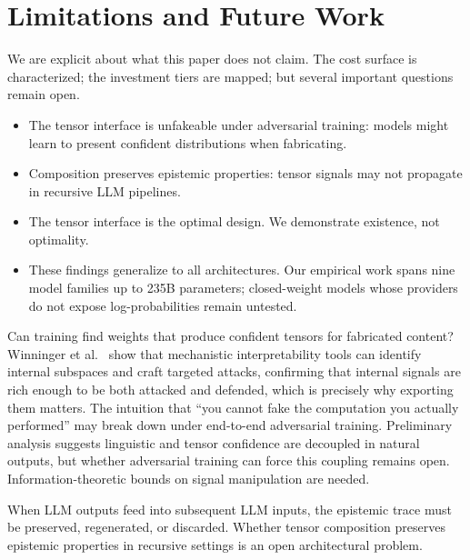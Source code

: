 \section{Limitations and Future Work}\label{sec:discussion}

We are explicit about what this paper does not claim. The cost surface
is characterized; the investment tiers are mapped; but several important
questions remain open.

\begin{itemize}
\item The tensor interface is unfakeable under adversarial training: models
  might learn to present confident distributions when fabricating.
\item Composition preserves epistemic properties: tensor signals may not
  propagate in recursive LLM pipelines.
\item The tensor interface is the optimal design. We demonstrate existence, not
  optimality.
\item These findings generalize to all architectures. Our empirical work spans
  nine model families up to 235B parameters; closed-weight models whose providers
  do not expose log-probabilities remain untested.
\end{itemize}

Can training find weights that produce confident tensors for fabricated content?
Winninger et al.~\cite{winninger2025usingmechanisticinterpretabilitycraft}
show that mechanistic interpretability tools can identify internal subspaces
and craft targeted attacks, confirming that internal signals are rich enough to
be both attacked and defended, which is precisely why exporting them matters.
The intuition that ``you cannot fake the computation you actually performed''
may break down under end-to-end adversarial training. Preliminary analysis
suggests linguistic and tensor confidence are decoupled in natural outputs, but
whether adversarial training can force this coupling remains open.
Information-theoretic bounds on signal manipulation are needed.

When LLM outputs feed into subsequent LLM inputs, the epistemic trace must
be preserved, regenerated, or discarded. Whether tensor composition preserves
epistemic properties in recursive settings is an open architectural problem.

